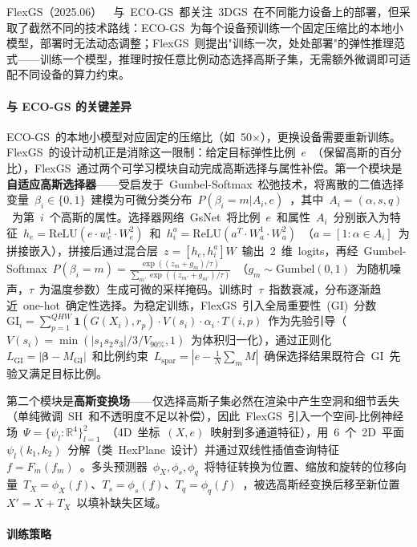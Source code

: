 FlexGS（2025.06）~\cite{2506_04174}~与~ECO-GS~都关注~3DGS~在不同能力设备上的部署，但采取了截然不同的技术路线：ECO-GS~为每个设备预训练一个固定压缩比的本地小模型，部署时无法动态调整；FlexGS~则提出"训练一次，处处部署"的弹性推理范式——训练一个模型，推理时按任意比例动态选择高斯子集，无需额外微调即可适配不同设备的算力约束。

\paragraph{与 ECO-GS 的关键差异}

ECO-GS~的本地小模型对应固定的压缩比（如~50$\times$），更换设备需要重新训练。FlexGS~的设计动机正是消除这一限制：给定目标弹性比例~$e$~（保留高斯的百分比），FlexGS~通过两个可学习模块自动完成高斯选择与属性补偿。第一个模块是\textbf{自适应高斯选择器}——受启发于~Gumbel-Softmax~松弛技术，将离散的二值选择变量~$\beta_i \in \{0,1\}$~建模为可微分类分布~$P(\beta_i = m | A_i, e)$~，其中~$A_i = (\alpha, s, q)$~为第~$i$~个高斯的属性。选择器网络~GsNet~将比例~$e$~和属性~$A_i$~分别嵌入为特征~$h_e = \text{ReLU}(e \cdot w_e^1 \cdot W_e^2)$~和~$h_i^a = \text{ReLU}(a^T \cdot W_a^1 \cdot W_a^2)$~（$a = [1 : \alpha \in A_i]$~为拼接嵌入），拼接后通过混合层~$z = [h_e, h_i^a] W$~输出~2~维~logits，再经~Gumbel-Softmax~$P(\beta_i = m) = \frac{\exp((z_m + g_m)/\tau)}{\sum_{m'}\exp((z_{m'} + g_{m'})/\tau)}$~（$g_m \sim \text{Gumbel}(0,1)$~为随机噪声，$\tau$~为温度参数）生成可微的采样掩码。训练时~$\tau$~指数衰减，分布逐渐趋近~one-hot~确定性选择。为稳定训练，FlexGS~引入全局重要性~(GI)~分数~$\text{GI}_i = \sum_{p=1}^{QHW} \mathbf{1}(G(X_i), r_p) \cdot V(s_i) \cdot \alpha_i \cdot T(i,p)$~作为先验引导（$V(s_i) = \min(|s_1 s_2 s_3|/3 / V_{90\%}, 1)$~为体积归一化），通过正则化~$L_\text{GI} = |\boldsymbol{\beta} - M_\text{GI}|$~和比例约束~$L_\text{spar} = |e - \frac{1}{N}\sum_m M|$~确保选择结果既符合~GI~先验又满足目标比例。

第二个模块是\textbf{高斯变换场}——仅选择高斯子集必然在渲染中产生空洞和细节丢失（单纯微调~SH~和不透明度不足以补偿），因此~FlexGS~引入一个空间-比例神经场~$\Psi = \{\psi_l: \mathbb{R}^4\}_{l=1}^2$~（4D~坐标~$(X, e)$~映射到多通道特征），用~6~个~2D~平面~$\psi_l(k_1, k_2)$~分解（类~HexPlane~设计）并通过双线性插值查询特征~$f = F_m(f_m)$~。多头预测器~$\phi_X, \phi_s, \phi_q$~将特征转换为位置、缩放和旋转的位移向量~$T_X = \phi_X(f)$、$T_s = \phi_s(f)$、$T_q = \phi_q(f)$~，被选高斯经变换后移至新位置~$X' = X + T_X$~以填补缺失区域。

\paragraph{训练策略}

